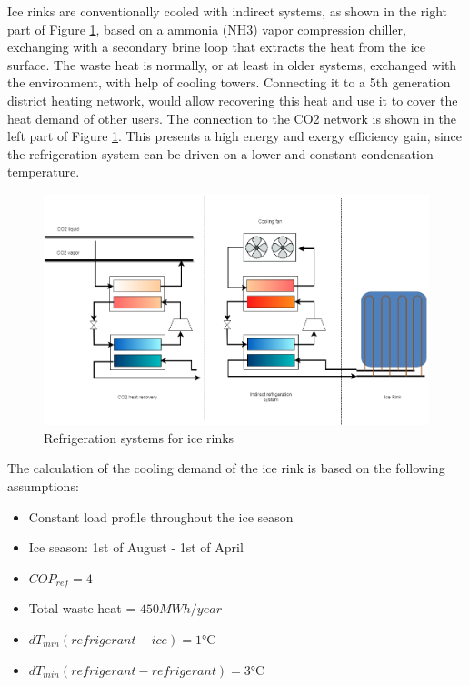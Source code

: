 \documentclass{article}
\begin{document}
Ice rinks are conventionally cooled with indirect systems, as shown in the right part of Figure \ref{fig:IR_refSystem}, based on a ammonia (NH3) vapor compression chiller, exchanging with a secondary brine loop that extracts the heat from the ice surface. The waste heat is normally, or at least in older systems, exchanged with the environment, with help of cooling towers. Connecting it to a 5th generation district heating network, would allow recovering this heat and use it to cover the heat demand of other users. The connection to the CO2 network is shown in the left part of Figure \ref{fig:IR_refSystem}. This presents a high energy and exergy efficiency gain, since the refrigeration system can be driven on a lower and constant condensation temperature.\\

\begin{figure}[htp]
	\centering
	\includegraphics[width=1\textwidth]{IceRink_refrigeration.png}
	\caption{Refrigeration systems for ice rinks}
	\label{fig:IR_refSystem}
\end{figure}

The calculation of the cooling demand of the ice rink is based on the following assumptions:
\begin{itemize}
	\item Constant load profile throughout the ice season
	\item Ice season: 1st of August - 1st of April
	\item $COP_{ref} = 4$ \cite{karampourMEASUREMENTMODELLINGICE}
	\item Total waste heat = $ 450 MWh/year$ \cite{kolasniewskiEvaluationModellingIce}
	\item $dT_{min}(refrigerant-ice) = 1 \si{\celsius}$
	\item $dT_{min}(refrigerant-refrigerant) = 3 \si{\celsius}$
\end{itemize}
\end{document}
